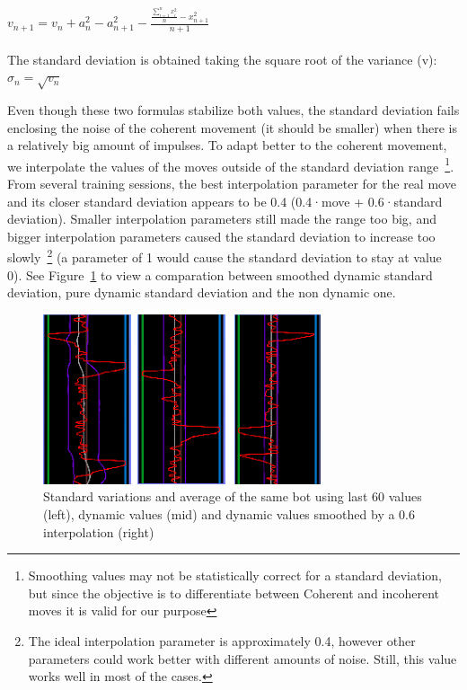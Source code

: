 \vspace{5mm}

$ {\displaystyle v_{n+1} = v_n + a_n^2-a_{n+1}^2 - \frac{\frac{\sum_{i=1}^{n}x_i^2}{n} - x_{n+1}^2}{n+1} } $\\\\

\noindent
The standard deviation is obtained taking the square root of the variance (v): $\sigma_n=\sqrt{v_n}$

Even though these two formulas stabilize both values, the standard deviation fails enclosing the noise of the coherent movement (it should be smaller) when there is a relatively big amount of impulses. To adapt better to the coherent movement, we interpolate the values of the moves outside of the standard deviation range~\footnote{Smoothing values may not be statistically correct for a standard deviation, but since the objective is to differentiate between Coherent and incoherent moves it is valid for our purpose}. From several training sessions, the best interpolation parameter for the real move and its closer standard deviation appears to be 0.4 (0.4·move + 0.6·standard deviation). Smaller interpolation parameters still made the range too big, and bigger interpolation parameters caused the standard deviation to increase too slowly~\footnote{The ideal interpolation parameter is approximately 0.4, however other parameters could work better with different amounts of noise. Still, this value works well in most of the cases.} (a parameter of 1 would cause the standard deviation to stay at value 0). See Figure~\ref{fig:stdVariations} to view a comparation between smoothed dynamic standard deviation, pure dynamic standard deviation and the non dynamic one.

\begin{figure}[h]
  \centering
		\includegraphics[width=.6\textwidth]{img/stdVariations.png}
  \caption{Standard variations and average of the same bot using last 60 values (left), dynamic values (mid) and dynamic values smoothed by a 0.6 interpolation (right)}
  \label{fig:stdVariations}
\end{figure}

